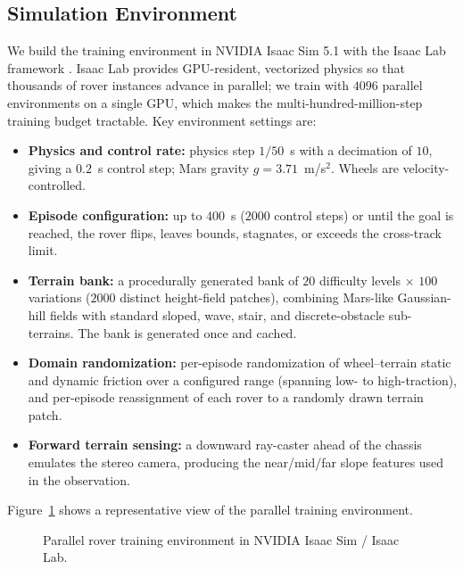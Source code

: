 \documentclass[conference]{IEEEtran}
\begin{document}
\subsection{Simulation Environment}
We build the training environment in NVIDIA Isaac Sim 5.1 with the Isaac Lab framework \cite{mittal2023orbit, makoviychuk2021isaac}. Isaac Lab provides GPU-resident, vectorized physics so that thousands of rover instances advance in parallel; we train with $4096$ parallel environments on a single GPU, which makes the multi-hundred-million-step training budget tractable. Key environment settings are:
\begin{itemize}
\item \textbf{Physics and control rate:} physics step $1/50$~s with a decimation of $10$, giving a $0.2$~s control step; Mars gravity $g = 3.71$~m/s$^2$. Wheels are velocity-controlled.
\item \textbf{Episode configuration:} up to $400$~s ($2000$ control steps) or until the goal is reached, the rover flips, leaves bounds, stagnates, or exceeds the cross-track limit.
\item \textbf{Terrain bank:} a procedurally generated bank of $20$ difficulty levels $\times$ $100$ variations ($2000$ distinct height-field patches), combining Mars-like Gaussian-hill fields with standard sloped, wave, stair, and discrete-obstacle sub-terrains. The bank is generated once and cached.
\item \textbf{Domain randomization:} per-episode randomization of wheel--terrain static and dynamic friction over a configured range (spanning low- to high-traction), and per-episode reassignment of each rover to a randomly drawn terrain patch.
\item \textbf{Forward terrain sensing:} a downward ray-caster ahead of the chassis emulates the stereo camera, producing the near/mid/far slope features used in the observation.
\end{itemize}

Figure~\ref{fig:sim_screenshot} shows a representative view of the parallel training environment.

\begin{figure}[t]
\centering
{}
\caption{Parallel rover training environment in NVIDIA Isaac Sim / Isaac Lab.}
\label{fig:sim_screenshot}
\end{figure}
\end{document}
